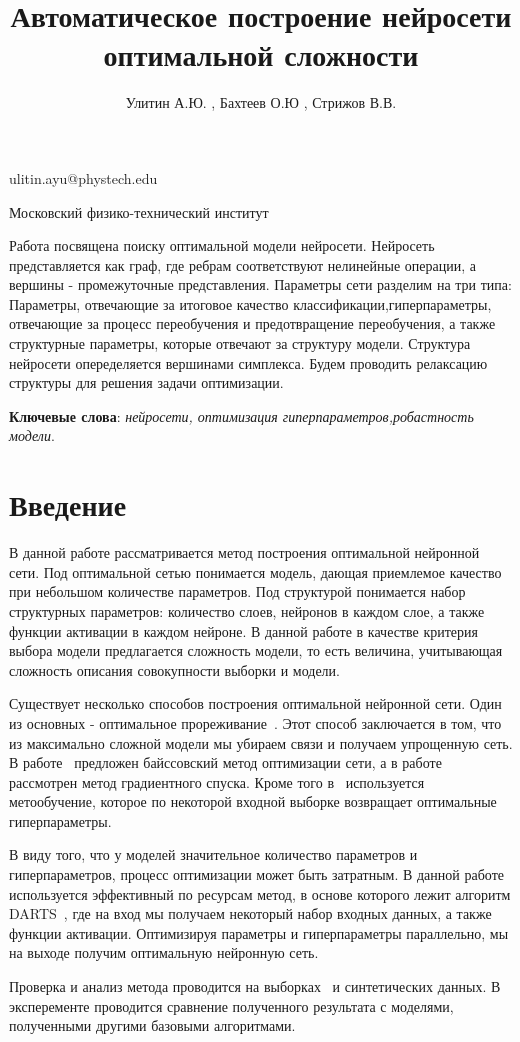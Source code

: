 \documentclass[12pt,twoside]{article}
\begin{document}
\title
    {Автоматическое построение нейросети оптимальной сложности}
\author
    {Улитин А.Ю. , Бахтеев О.Ю , Стрижов В.В.} %
\email
    {ulitin.ayu@phystech.edu}

\organization
    {Московский физико-технический институт}
\abstract
	{Работа посвящена поиску  оптимальной модели нейросети. Нейросеть представляется как граф, где ребрам соответствуют нелинейные операции, а вершины - промежуточные представления. Параметры сети разделим на три типа: Параметры, отвечающие за итоговое качество классификации,гиперпараметры, отвечающие за процесс переобучения и предотвращение переобучения, а также структурные параметры, которые отвечают за структуру  модели. Структура нейросети опеределяется вершинами симплекса. Будем проводить релаксацию структуры для решения задачи оптимизации. 


\bigskip
\textbf{Ключевые слова}: \emph {нейросети, оптимизация гиперпараметров,робастность модели}.

}

\maketitle

\section{Введение}
В данной работе рассматривается метод построения оптимальной нейронной сети. Под оптимальной сетью понимается модель, дающая приемлемое качество при небольшом количестве параметров. Под структурой понимается набор структурных параметров: количество слоев, нейронов в каждом слое, а также функции активации в каждом нейроне. В данной работе в качестве критерия выбора модели предлагается сложность модели, то есть величина, учитывающая сложность описания совокупности выборки и модели.

\par Существует несколько способов построения оптимальной нейронной сети. Один из основных - оптимальное прореживание~\cite{BrainDamage}. Этот способ заключается в том, что из максимально сложной модели мы убираем связи и получаем упрощенную сеть. В работе~\cite{BayesOptim}  предложен байссовский метод оптимизации сети, а в работе~\cite{GradientOptim} рассмотрен метод градиентного спуска. Кроме того в~\cite{Met} используется метообучение, которое по некоторой входной выборке возвращает оптимальные гиперпараметры.
\par В виду того, что у моделей значительное количество параметров и гиперпараметров, процесс оптимизации может быть затратным. В данной работе используется эффективный по ресурсам метод, в основе которого лежит алгоритм DARTS~\cite{DARTS}, где на вход мы получаем некоторый набор входных данных, а также функции активации. Оптимизируя параметры и гиперпараметры параллельно, мы на выходе получим оптимальную нейронную сеть.
\par Проверка и анализ метода проводится на выборках~\cite{Boston,MNIST,CIFAR-10} и синтетических данных. В эксперементе проводится сравнение полученного результата с моделями, полученными другими базовыми алгоритмами.
\end{document}
